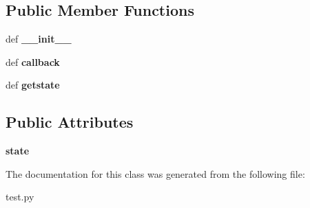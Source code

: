 \subsection*{Public Member Functions}
\begin{DoxyCompactItemize}
\item 
\hypertarget{classtest_1_1_staterobot_a825aa6cfc4a937fae93b18eb22d5049d}{def {\bfseries \-\_\-\-\_\-init\-\_\-\-\_\-}}\label{classtest_1_1_staterobot_a825aa6cfc4a937fae93b18eb22d5049d}

\item 
\hypertarget{classtest_1_1_staterobot_a2c8f2fc540f84bfc18477fdde6510bfa}{def {\bfseries callback}}\label{classtest_1_1_staterobot_a2c8f2fc540f84bfc18477fdde6510bfa}

\item 
\hypertarget{classtest_1_1_staterobot_a5663f3bcd6262303e19c4735396cbef2}{def {\bfseries getstate}}\label{classtest_1_1_staterobot_a5663f3bcd6262303e19c4735396cbef2}

\end{DoxyCompactItemize}
\subsection*{Public Attributes}
\begin{DoxyCompactItemize}
\item 
\hypertarget{classtest_1_1_staterobot_a6ac3890142e62ba6a4e96f3090fa9b38}{{\bfseries state}}\label{classtest_1_1_staterobot_a6ac3890142e62ba6a4e96f3090fa9b38}

\end{DoxyCompactItemize}


The documentation for this class was generated from the following file\-:\begin{DoxyCompactItemize}
\item 
test.\-py\end{DoxyCompactItemize}

